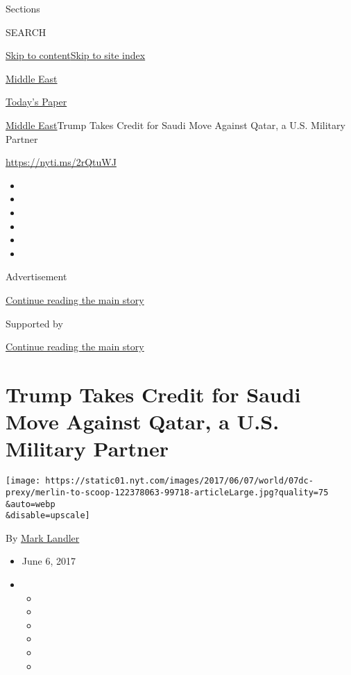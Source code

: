 Sections

SEARCH

\protect\hyperlink{site-content}{Skip to
content}\protect\hyperlink{site-index}{Skip to site index}

\href{https://www.nytimes.com/section/world/middleeast}{Middle East}

\href{https://myaccount.nytimes.com/auth/login?response_type=cookie\&client_id=vi}{}

\href{https://www.nytimes.com/section/todayspaper}{Today's Paper}

\href{/section/world/middleeast}{Middle East}\textbar{}Trump Takes
Credit for Saudi Move Against Qatar, a U.S. Military Partner

\url{https://nyti.ms/2rQtuWJ}

\begin{itemize}
\item
\item
\item
\item
\item
\item
\end{itemize}

Advertisement

\protect\hyperlink{after-top}{Continue reading the main story}

Supported by

\protect\hyperlink{after-sponsor}{Continue reading the main story}

\hypertarget{trump-takes-credit-for-saudi-move-against-qatar-a-us-military-partner}{%
\section{Trump Takes Credit for Saudi Move Against Qatar, a U.S.
Military
Partner}\label{trump-takes-credit-for-saudi-move-against-qatar-a-us-military-partner}}

\texttt{[image: https://static01.nyt.com/images/2017/06/07/world/07dc-prexy/merlin-to-scoop-122378063-99718-articleLarge.jpg?quality=75\\\&auto=webp\\\&disable=upscale]}

By \href{http://www.nytimes.com/by/mark-landler}{Mark Landler}

\begin{itemize}
\item
  June 6, 2017
\item
  \begin{itemize}
  \item
  \item
  \item
  \item
  \item
  \item
  \end{itemize}
\end{itemize}

